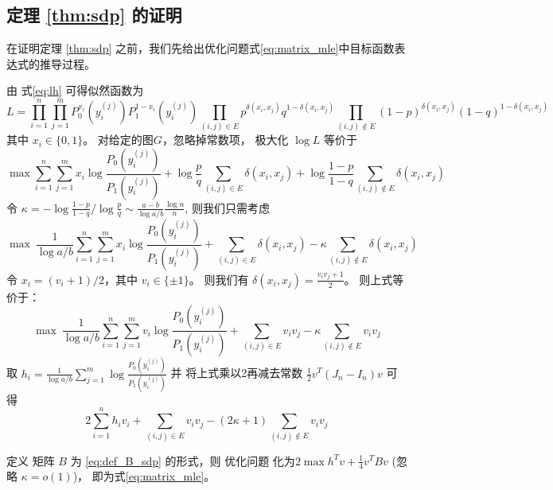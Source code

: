 \subsection{定理 \ref{thm:sdp} 的证明}
\label{sec:thm_sdp_proof}
在证明定理 \ref{thm:sdp}  之前，我们先给出优化问题式\eqref{eq:matrix_mle}中目标函数表达式的推导过程。

由 式\eqref{eq:lh} 可得似然函数为
$$
L=\prod_{i=1}^n \prod_{j=1}^m P_0^{x_i}(y_i^{(j)})P_1^{1-x_i}(y_i^{(j)})
\prod_{(i,j) \in E} p^{\delta(x_i, x_j)}q^{1-\delta(x_i, x_j)}
\prod_{(i,j)\not\in E} (1-p)^{\delta(x_i, x_j)}(1-q)^{1-\delta(x_i, x_j)}
$$
其中 $x_i \in \{0,1\}$。
对给定的图$G$，忽略掉常数项， 极大化 $ \log L$ 等价于
$$
\max \sum_{i=1}^n \sum_{j=1}^m x_i \log \frac{P_0(y_i^{(j)})}{P_1(y_i^{(j)})}
+\log\frac{p}{q}\sum_{(i,j) \in E} \delta(x_i, x_j)
+\log \frac{1-p}{1-q}\sum_{(i,j)\not\in E} \delta(x_i, x_j)
$$
令 $\kappa = -\log\frac{1-p}{1-q} / \log\frac{p}{q} \sim \frac{a-b}{\log a/b}\frac{\log n}{n}$,
则我们只需考虑
$$
\max\  \frac{1}{\log a/b}\sum_{i=1}^n \sum_{j=1}^m x_i \log \frac{P_0(y_i^{(j)})}{P_1(y_i^{(j)})}
+\sum_{(i,j) \in E} \delta(x_i, x_j)
-\kappa\sum_{(i,j)\not\in E} \delta(x_i, x_j)
$$
令 $x_i = (v_i+1)/2$，其中 $v_i \in \{\pm 1 \}$。
则我们有 $\delta(x_i, x_j) = \frac{v_i v_j + 1}{2}$。
则上式等价于：
$$
\max\  \frac{1}{\log a/b}\sum_{i=1}^n \sum_{j=1}^m v_i \log \frac{P_0(y_i^{(j)})}{P_1(y_i^{(j)})}
+\sum_{(i,j) \in E} v_i v_j
-\kappa\sum_{(i,j)\not\in E} v_i v_j
$$
取 $h_i = \frac{1}{\log a/b}\sum_{j=1}^m \log \frac{P_0(y_i^{(j)})}{P_1(y_i^{(j)})}$
并
将上式乘以2再减去常数 $\frac{1}{2}v^T(J_n-I_n)v$ 可得
$$
2\sum_{i=1}^n h_iv_i + \sum_{(i,j)\in E} v_i v_j - (2\kappa+1) \sum_{(i,j)\not\in E} v_i v_j
$$

定义 矩阵 $B$ 为 \eqref{eq:def_B_sdp} 的形式，则
优化问题 化为$2\max h^T v + \frac{1}{4}v^T B v$ (忽略 $\kappa=o(1)$)，
即为式\eqref{eq:matrix_mle}。

